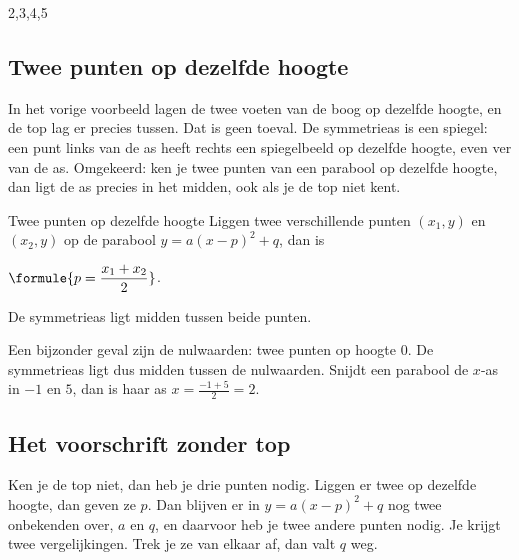 \begin{alleenvoor}{2,3,4,5}
\subsection{Twee punten op dezelfde hoogte}

In het vorige voorbeeld lagen de twee voeten van de boog op dezelfde hoogte, en de top lag er precies tussen. Dat is geen toeval. De symmetrieas is een spiegel: een punt links van de as heeft rechts een spiegelbeeld op dezelfde hoogte, even ver van de as. Omgekeerd: ken je twee punten van een parabool op dezelfde hoogte, dan ligt de as precies in het midden, ook als je de top niet kent.

\begin{theorie}
\begin{stelling}{Twee punten op dezelfde hoogte}
Liggen twee verschillende punten $(x_1, y)$ en $(x_2, y)$ op de parabool $y = a(x - p)^2 + q$, dan is

\qquad $\formule{p = \dfrac{x_1 + x_2}{2}}$.

De symmetrieas ligt midden tussen beide punten.
\end{stelling}
\end{theorie}

Een bijzonder geval zijn de nulwaarden: twee punten op hoogte $0$. De symmetrieas ligt dus midden tussen de nulwaarden. Snijdt een parabool de $x$-as in $-1$ en $5$, dan is haar as $x = \tfrac{-1 + 5}{2} = 2$.

\subsection{Het voorschrift zonder top}

Ken je de top niet, dan heb je drie punten nodig. Liggen er twee op dezelfde hoogte, dan geven ze $p$. Dan blijven er in $y = a(x - p)^2 + q$ nog twee onbekenden over, $a$ en $q$, en daarvoor heb je twee andere punten nodig. Je krijgt twee vergelijkingen. Trek je ze van elkaar af, dan valt $q$ weg.


\end{alleenvoor}
